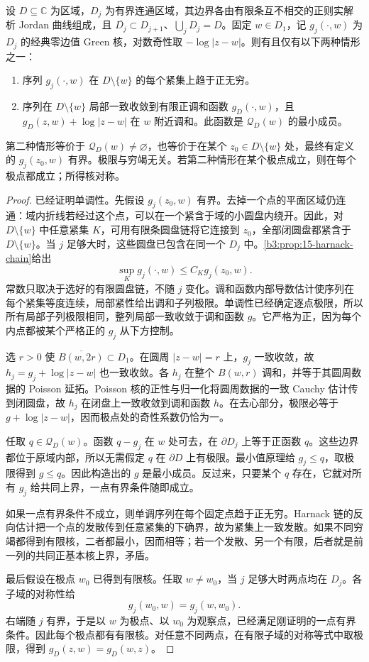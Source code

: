 \begin{theorem}\label{b3:thm:17-green-exhaustion}
设 \(D\subseteq\mathbb C\) 为区域，\(D_j\) 为有界连通区域，其边界各由有限条互不相交的正则实解析 Jordan 曲线组成，且 \(\overline{D_j}\subset D_{j+1}\)、\(\bigcup_jD_j=D\)。固定 \(w\in D_1\)，记 \(g_j(\cdot,w)\) 为 \(D_j\) 的经典零边值 Green 核，对数奇性取 \(-\log|z-w|\)。则有且仅有以下两种情形之一：
\begin{enumerate}
\item 序列 \(g_j(\cdot,w)\) 在 \(D\setminus\{w\}\) 的每个紧集上趋于正无穷。
\item 序列在 \(D\setminus\{w\}\) 局部一致收敛到有限正调和函数 \(g_D(\cdot,w)\)，且 \(g_D(z,w)+\log|z-w|\) 在 \(w\) 附近调和。此函数是 \(\mathcal Q_D(w)\) 的最小成员。
\end{enumerate}
第二种情形等价于 \(\mathcal Q_D(w)\ne\varnothing\)，也等价于在某个 \(z_0\in D\setminus\{w\}\) 处，最终有定义的 \(g_j(z_0,w)\) 有界。极限与穷竭无关。若第二种情形在某个极点成立，则在每个极点都成立；所得核对称。
\end{theorem}
\begin{proof}
已经证明单调性。先假设 \(g_j(z_0,w)\) 有界。去掉一个点的平面区域仍连通：域内折线若经过这个点，可以在一个紧含于域的小圆盘内绕开。因此，对 \(D\setminus\{w\}\) 中任意紧集 \(K\)，可用有限条圆盘链将它连接到 \(z_0\)，全部闭圆盘都紧含于 \(D\setminus\{w\}\)。当 \(j\) 足够大时，这些圆盘已包含在同一个 \(D_j\) 中。\cref{b3:prop:15-harnack-chain}给出
\[
 \sup_K g_j(\cdot,w)\le C_K g_j(z_0,w).
\]
常数只取决于选好的有限圆盘链，不随 \(j\) 变化。调和函数内部导数估计使序列在每个紧集等度连续，局部紧性给出调和子列极限。单调性已经确定逐点极限，所以所有局部子列极限相同，整列局部一致收敛于调和函数 \(g\)。它严格为正，因为每个内点都被某个严格正的 \(g_j\) 从下方控制。

选 \(r>0\) 使 \(\overline{B(w,2r)}\subset D_1\)。在圆周 \(|z-w|=r\) 上，\(g_j\) 一致收敛，故 \(h_j=g_j+\log|z-w|\) 也一致收敛。各 \(h_j\) 在整个 \(B(w,r)\) 调和，并等于其圆周数据的 Poisson 延拓。Poisson 核的正性与归一化将圆周数据的一致 Cauchy 估计传到闭圆盘，故 \(h_j\) 在闭盘上一致收敛到调和函数 \(h\)。在去心部分，极限必等于 \(g+\log|z-w|\)，因而极点处的奇性系数仍恰为一。

任取 \(q\in\mathcal Q_D(w)\)。函数 \(q-g_j\) 在 \(w\) 处可去，在 \(\partial D_j\) 上等于正函数 \(q\)。这些边界都位于原域内部，所以无需假定 \(q\) 在 \(\partial D\) 上有极限。最小值原理给 \(g_j\le q\)，取极限得到 \(g\le q\)。因此构造出的 \(g\) 是最小成员。反过来，只要某个 \(q\) 存在，它就对所有 \(g_j\) 给共同上界，一点有界条件随即成立。

如果一点有界条件不成立，则单调序列在每个固定点趋于正无穷。Harnack 链的反向估计把一个点的发散传到任意紧集的下确界，故为紧集上一致发散。如果不同穷竭都得到有限核，二者都最小，因而相等；若一个发散、另一个有限，后者就是前一列的共同正基本核上界，矛盾。

最后假设在极点 \(w_0\) 已得到有限核。任取 \(w\ne w_0\)，当 \(j\) 足够大时两点均在 \(D_j\)。各子域的对称性给
\[
 g_j(w_0,w)=g_j(w,w_0).
\]
右端随 \(j\) 有界，于是以 \(w\) 为极点、以 \(w_0\) 为观察点，已经满足刚证明的一点有界条件。因此每个极点都有有限核。对任意不同两点，在有限子域的对称等式中取极限，得到 \(g_D(z,w)=g_D(w,z)\)。
\end{proof}

